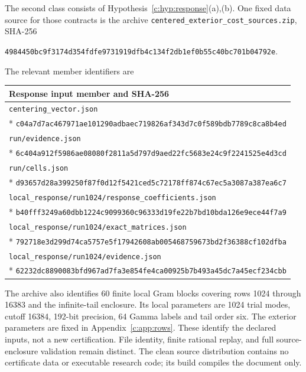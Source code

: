 \documentclass[11pt,a4paper]{article}
\numberwithin{equation}{section}
\theoremstyle{definition}\newtheorem{definition}[theorem]{Definition}
\theoremstyle{remark}\newtheorem{remark}[theorem]{Remark}
\begin{document}
The second class consists of Hypothesis~\ref{c:hyp:response}(a),(b).
One fixed data source for those contracts is the archive
\texttt{centered\_exterior\_cost\_sources.zip}, SHA-256
\begin{center}\small
\nolinkurl{4984450bc9f3174d354fdfe9731919dfb4c134f2db1ef0b55c40bc701b04792e}.
\end{center}
The relevant member identifiers are
\begingroup\small
\begin{longtable}{@{}p{}@{}}
\toprule Response input member and SHA-256\\\midrule\endhead
\texttt{centering\_vector.json}\\*
\nolinkurl{c04a7d7ac467971ae101290adbaec719826af343d7c0f589bdb7789c8ca8b4ed}\\[3pt]
\texttt{run/evidence.json}\\*
\nolinkurl{6c404a912f5986ae08080f2811a5d797d9aed22fc5683e24c9f2241525e4d3cd}\\[3pt]
\texttt{run/cells.json}\\*
\nolinkurl{d93657d28a399250f87f0d12f5421ced5c72178ff874c67ec5a3087a387ea6c7}\\[3pt]
\texttt{local\_response/run1024/response\_coefficients.json}\\*
\nolinkurl{b40fff3249a60dbb1224c9099360c96333d19fe22b7bd10bda126e9ece44f7a9}\\[3pt]
\texttt{local\_response/run1024/exact\_matrices.json}\\*
\nolinkurl{792718e3d299d74ca5757e5f17942608ab005468759673bd2f36388cf102dfba}\\[3pt]
\texttt{local\_response/run1024/evidence.json}\\*
\nolinkurl{62232dc8890083bfd967ad7fa3e854fe4ca00925b7b493a45dc7a45ecf234cbb}\\
\bottomrule
\end{longtable}\endgroup
The archive also identifies 60 finite local Gram blocks covering rows 1024 through 16383 and the infinite-tail enclosure.
Its local parameters are 1024 trial modes, cutoff 16384, 192-bit precision, 64 Gamma labels and tail order six.
The exterior parameters are fixed in Appendix~\ref{c:app:rows}.
These identify the declared inputs, not a new certification.
File identity, finite rational replay, and full source-enclosure validation remain distinct.
The clean source distribution contains no certificate data or executable research code; its build compiles the document only.
\end{document}
